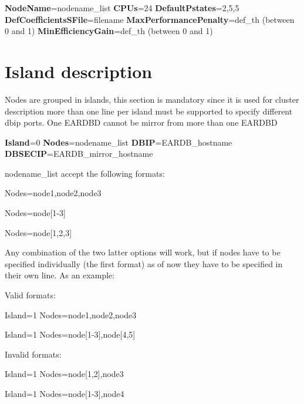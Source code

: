 {\bfseries Node\+Name}=nodename\+\_\+list {\bfseries C\+P\+Us}=24 {\bfseries Default\+Pstates}=2,5,5 {\bfseries Def\+Coefficients\+S\+File}=filename {\bfseries Max\+Performance\+Penalty}=def\+\_\+th (between 0 and 1) {\bfseries Min\+Efficiency\+Gain}=def\+\_\+th (between 0 and 1)

\section*{Island description}

Nodes are grouped in islands, this section is mandatory since it is used for cluster description more than one line per island must be supported to specify different dbip ports. One E\+A\+R\+D\+BD cannot be mirror from more than one E\+A\+R\+D\+BD

{\bfseries Island}=0 {\bfseries Nodes}=nodename\+\_\+list {\bfseries D\+B\+IP}=E\+A\+R\+D\+B\+\_\+hostname {\bfseries D\+B\+S\+E\+C\+IP}=E\+A\+R\+D\+B\+\_\+mirror\+\_\+hostname


\begin{DoxyItemize}
\item nodename\+\_\+list accept the following formats\+:
\begin{DoxyItemize}
\item Nodes=node1,node2,node3
\item Nodes=node\mbox{[}1-\/3\mbox{]}
\item Nodes=node\mbox{[}1,2,3\mbox{]}
\end{DoxyItemize}
\item Any combination of the two latter options will work, but if nodes have to be specified individually (the first format) as of now they have to be specified in their own line. As an example\+:
\begin{DoxyItemize}
\item Valid formats\+:
\begin{DoxyItemize}
\item Island=1 Nodes=node1,node2,node3
\item Island=1 Nodes=node\mbox{[}1-\/3\mbox{]},node\mbox{[}4,5\mbox{]}
\end{DoxyItemize}
\item Invalid formats\+:
\begin{DoxyItemize}
\item Island=1 Nodes=node\mbox{[}1,2\mbox{]},node3
\item Island=1 Nodes=node\mbox{[}1-\/3\mbox{]},node4 
\end{DoxyItemize}
\end{DoxyItemize}
\end{DoxyItemize}